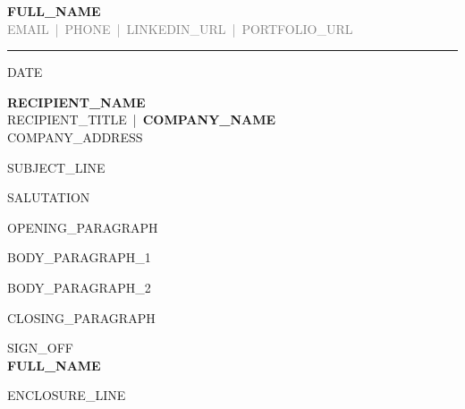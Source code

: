 \documentclass[a4paper,10pt]{article}
\begin{document}
{\Huge \textbf{{{FULL_NAME}}}}\\[4pt]
{\small \textcolor{gray}{{{EMAIL}} \,|\, {{PHONE}} \,|\, {{LINKEDIN_URL}} \,|\, {{PORTFOLIO_URL}}}}\\
\rule{\textwidth}{0.5pt}

\vspace{1em}
{{DATE}}

\vspace{0.5em}
\textbf{{{RECIPIENT_NAME}}}\\
{{RECIPIENT_TITLE}} \,|\, \textbf{{{COMPANY_NAME}}}\\
{{COMPANY_ADDRESS}}

\vspace{1em}
{{SUBJECT_LINE}}

\vspace{0.5em}
{{SALUTATION}}

{{OPENING_PARAGRAPH}}

{{BODY_PARAGRAPH_1}}

{{BODY_PARAGRAPH_2}}

{{CLOSING_PARAGRAPH}}

\vspace{1.5em}
{{SIGN_OFF}}\\[1.5em]
\textbf{{{FULL_NAME}}}

\vspace{2em}
{{ENCLOSURE_LINE}}
\end{document}
